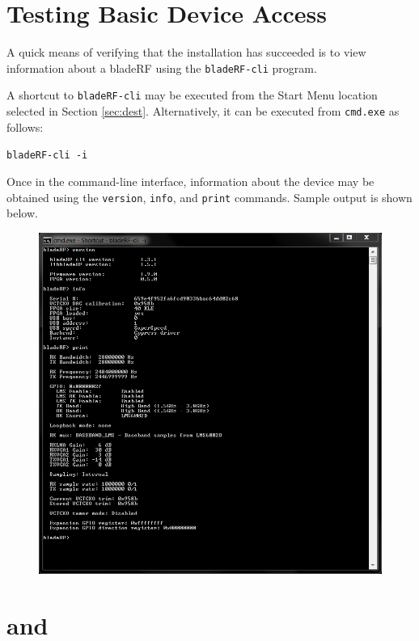 {\newpage
\section{Testing Basic Device Access}

A quick means of verifying that the installation has succeeded is to
view information about a bladeRF using the \texttt{bladeRF-cli} program.

A shortcut to \texttt{bladeRF-cli} may be executed from the Start Menu
location selected in Section \ref{sec:dest}.  Alternatively, it can
be executed from \texttt{cmd.exe} as follows:

\centerline{\texttt{bladeRF-cli -i}}

Once in the command-line interface, information about the
device may be obtained using the \texttt{version}, \texttt{info},
and \texttt{print} commands. Sample output is shown below.

\begin{figure}[h]
  \centering
  \includegraphics[width=6in]{images/windows/bladeRF-cli/cli-info.png}
\end{figure}

\newpage
\section{\matlab and \simulink}

}
